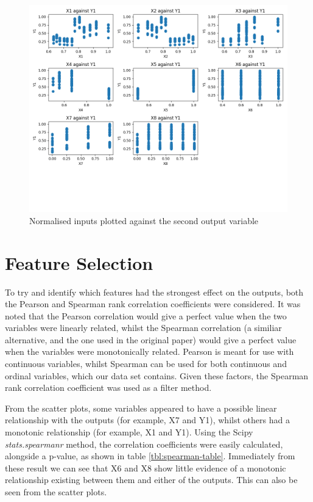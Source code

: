 \documentclass[12pt]{article}
\begin{document}
\begin{figure}[!ht]
\centering
\includegraphics[width=0.8 \linewidth]{images/XsVsY0}
\caption{Normalised inputs plotted against the second output variable}
\label{fig:xvsy1}
\end{figure}

\FloatBarrier

\part{Feature Selection}

To try and identify which features had the strongest effect on the outputs, both the Pearson and Spearman rank correlation coefficients were considered. It was noted that the Pearson correlation would give a perfect value when the two variables were linearly related, whilst the Spearman correlation (a similiar alternative, and the one used in the original paper) would give a perfect value when the variables were monotonically related. Pearson is meant for use with continuous variables, whilst Spearman can be used for both continuous and ordinal variables, which our data set contains. Given these factors, the Spearman rank correlation coefficient was used as a filter method.

From the scatter plots, some variables appeared to have a possible linear relationship with the outputs (for example, X7 and Y1), whilst others had a monotonic relationship (for example, X1 and Y1). Using the Scipy \emph{stats.spearmanr} method, the correlation coefficients were easily calculated, alongside a p-value, as shown in table \ref{tbl:spearman-table}. Immediately from these result we can see that X6 and X8 show little evidence of a monotonic relationship existing between them and either of the outputs. This can also be seen from the scatter plots.
\end{document}
